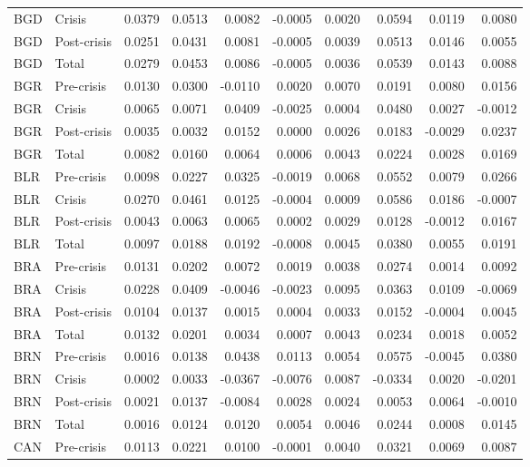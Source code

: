 \begin{longtable}[t]{llrrrrrrrr}
BGD & Crisis & 0.0379 & 0.0513 & 0.0082 & -0.0005 & 0.0020 & 0.0594 & 0.0119 & 0.0080\\
BGD & Post-crisis & 0.0251 & 0.0431 & 0.0081 & -0.0005 & 0.0039 & 0.0513 & 0.0146 & 0.0055\\
BGD & Total & 0.0279 & 0.0453 & 0.0086 & -0.0005 & 0.0036 & 0.0539 & 0.0143 & 0.0088\\
\addlinespace
BGR & Pre-crisis & 0.0130 & 0.0300 & -0.0110 & 0.0020 & 0.0070 & 0.0191 & 0.0080 & 0.0156\\
BGR & Crisis & 0.0065 & 0.0071 & 0.0409 & -0.0025 & 0.0004 & 0.0480 & 0.0027 & -0.0012\\
BGR & Post-crisis & 0.0035 & 0.0032 & 0.0152 & 0.0000 & 0.0026 & 0.0183 & -0.0029 & 0.0237\\
BGR & Total & 0.0082 & 0.0160 & 0.0064 & 0.0006 & 0.0043 & 0.0224 & 0.0028 & 0.0169\\
BLR & Pre-crisis & 0.0098 & 0.0227 & 0.0325 & -0.0019 & 0.0068 & 0.0552 & 0.0079 & 0.0266\\
\addlinespace
BLR & Crisis & 0.0270 & 0.0461 & 0.0125 & -0.0004 & 0.0009 & 0.0586 & 0.0186 & -0.0007\\
BLR & Post-crisis & 0.0043 & 0.0063 & 0.0065 & 0.0002 & 0.0029 & 0.0128 & -0.0012 & 0.0167\\
BLR & Total & 0.0097 & 0.0188 & 0.0192 & -0.0008 & 0.0045 & 0.0380 & 0.0055 & 0.0191\\
BRA & Pre-crisis & 0.0131 & 0.0202 & 0.0072 & 0.0019 & 0.0038 & 0.0274 & 0.0014 & 0.0092\\
BRA & Crisis & 0.0228 & 0.0409 & -0.0046 & -0.0023 & 0.0095 & 0.0363 & 0.0109 & -0.0069\\
\addlinespace
BRA & Post-crisis & 0.0104 & 0.0137 & 0.0015 & 0.0004 & 0.0033 & 0.0152 & -0.0004 & 0.0045\\
BRA & Total & 0.0132 & 0.0201 & 0.0034 & 0.0007 & 0.0043 & 0.0234 & 0.0018 & 0.0052\\
BRN & Pre-crisis & 0.0016 & 0.0138 & 0.0438 & 0.0113 & 0.0054 & 0.0575 & -0.0045 & 0.0380\\
BRN & Crisis & 0.0002 & 0.0033 & -0.0367 & -0.0076 & 0.0087 & -0.0334 & 0.0020 & -0.0201\\
BRN & Post-crisis & 0.0021 & 0.0137 & -0.0084 & 0.0028 & 0.0024 & 0.0053 & 0.0064 & -0.0010\\
\addlinespace
BRN & Total & 0.0016 & 0.0124 & 0.0120 & 0.0054 & 0.0046 & 0.0244 & 0.0008 & 0.0145\\
CAN & Pre-crisis & 0.0113 & 0.0221 & 0.0100 & -0.0001 & 0.0040 & 0.0321 & 0.0069 & 0.0087\\

\end{longtable}
